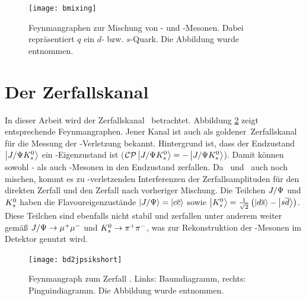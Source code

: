 \begin{figure}[hptb]
\centering
\texttt{[image: bmixing]}
\caption{Feynmangraphen zur Mischung von \Bd- und \Bdbar-Mesonen. Dabei repräsentiert $q$ ein $d$- bzw. $s$-Quark. Die Abbildung wurde \cite{roadmap} entnommen.}
\label{fig:bmixing}
\end{figure}


\section{Der Zerfallskanal \boldmath\Decaychannel\unboldmath}
In dieser Arbeit wird der Zerfallskanal \Decaychannel\ betrachtet. Abbildung \ref{fig:decay} zeigt entsprechende Feynmangraphen. Jener Kanal ist auch als \glqq goldener\grqq\ Zerfallskanal für die Messung der \CP-Verletzung bekannt. Hintergrund ist, dass der Endzustand $\Ket{J/\Psi K_s^0}$ ein \CP-Eigenzustand ist ($\text{$\mathcal{CP}$}\Ket{J/\Psi K_s^0} = - \Ket{J/\Psi K_s^0}$). Damit können sowohl \Bd- als auch \Bdbar-Mesonen in den Endzustand zerfallen. Da \Bd\ und \Bdbar\ auch noch mischen, kommt es zu \CP-verletzenden Interferenzen der Zerfallsamplituden für den direkten Zerfall und den Zerfall nach vorheriger Mischung. Die Teilchen $J/\Psi$ und $K_s^0$ haben die Flavoureigenzustände $\Ket{J/\Psi} = \Ket{c\overline{c}}$ sowie $\Ket{K_s^0} = \tfrac{1}{\sqrt{2}}\left(\Ket{d\overline{s}}-\Ket{s\overline{d}}\right)$. Diese Teilchen sind ebenfalls nicht stabil und zerfallen unter anderem weiter gemäß $J/\Psi \rightarrow \mu^+\mu^-$ und $K_s^0 \rightarrow \pi^+\pi^-$, was zur Rekonstruktion der \Bd-Mesonen im Detektor genutzt wird.

\begin{figure}[hptb]
\centering
\texttt{[image: bd2jpsikshort]}
\caption{Feynmangraph zum Zerfall \Decaychannel. Links: Baumdiagramm, rechts: Pinguindiagramm. Die Abbildung wurde \cite{lhcb-paper} entnommen.}
\label{fig:decay}
\end{figure}

